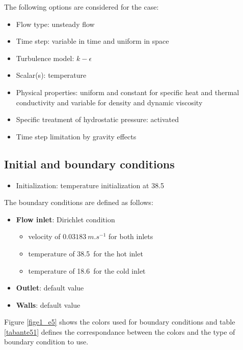 The following options are considered for the case:
\begin{itemize}
\renewcommand{\labelitemi}{$\rightarrow$}
        \item Flow type: unsteady flow
        \item Time step: variable in time and uniform in space
        \item Turbulence model: $k-\epsilon$
        \item Scalar(s): temperature
        \item Physical properties: uniform and constant for specific heat and
thermal conductivity and variable for density and dynamic viscosity
        \item Specific treatment of hydrostatic pressure: activated
        \item Time step limitation by gravity effects
\end{itemize}


        \subsection{Initial and boundary conditions}

\begin{itemize}
\renewcommand{\labelitemi}{$\rightarrow$}
        \item Initialization: temperature initialization at 38.5\degresC
\end{itemize}

The boundary conditions are defined as follows:

\begin{itemize}
        \item {\bfseries Flow inlet}: Dirichlet condition
        \begin{itemize}
                \item velocity of $0.03183\ m.s^{-1}$ for both inlets
                \item temperature of 38.5\degresC\ for the hot inlet
                \item temperature of 18.6\degresC\ for the cold inlet
        \end{itemize}
        \item {\bfseries Outlet}: default value
        \item {\bfseries Walls}: default value
\end{itemize}

Figure \ref{fige1_e5} shows the colors used for boundary conditions and
table \ref{tabante51} defines the correspondance between the colors and
the type of boundary condition to use.

